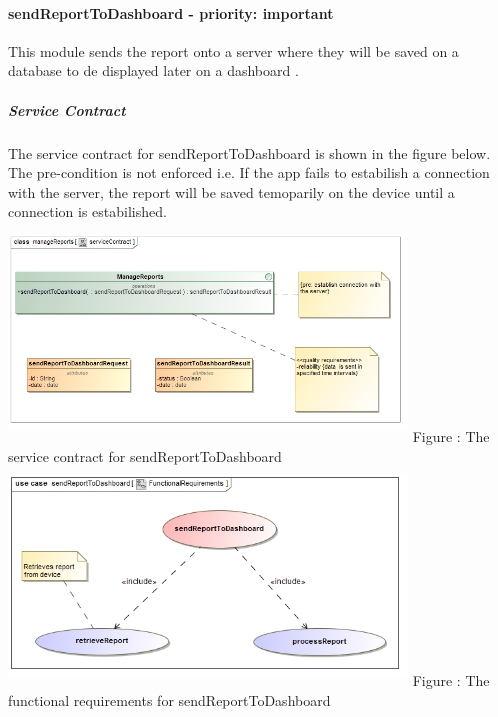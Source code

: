 \documentclass[hidelinks, 12pt, oneside]{article}
\begin{document}
		\paragraph{ sendReportToDashboard - priority: important}
		This module sends the report onto a server where they will be saved on a database to de displayed later on a dashboard .\newline
		\subparagraph{Service Contract}
			The service contract for sendReportToDashboard is shown in the figure below. The pre-condition is not enforced i.e. If the app fails to estabilish a connection with the server, the report will be saved temoparily on the device until a connection is estabilished.\newline
		\includegraphics[width=400px,height=220px]{img/serviceContractSendReportToDashboard.jpg}
			Figure : The service contract for sendReportToDashboard\newline \newline \newline
		\includegraphics[width=400px,height=220px]{img/functionalRequirementsSendReportToDashboard.jpg}
			Figure : The functional requirements for sendReportToDashboard\newline	
\end{document}
